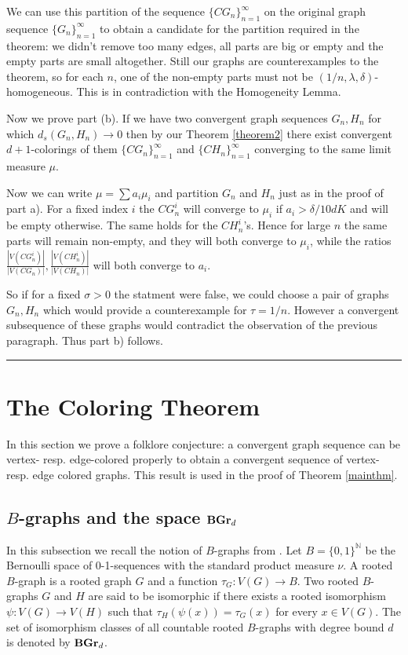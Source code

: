 \documentclass{article}
\newcommand{\N}{\mathbb{N}}
\newcommand{\BGrd}[1][d]{\textrm{\textbf{BGr}}_{#1}}
\newcommand{\qed} {\hspace {0.1in} \rule {1.5mm} {3.5mm}}
\begin{document}
We can use this partition of the sequence $\{CG_n\}^\infty_{n=1}$ on the
original graph sequence $\{G_n\}^\infty_{n=1}$  to obtain a candidate for
 the partition
required in the theorem: we didn't remove too many edges, all parts
are big or empty and the empty parts are small altogether. Still our
graphs are counterexamples to the theorem, so for each $n$, one of the
non-empty parts must not be $(1/n,\lambda, \delta)$-homogeneous. This is
in contradiction with the Homogeneity Lemma.

\noindent
Now we prove part (b).  If we have two convergent graph sequences
$G_n, H_n$ for which $d_s(G_n,H_n) \to 0$ then by our Theorem \ref{theorem2}
there exist convergent $d+1$-colorings of them $\{CG_n\}^\infty_{n=1}$
and $\{CH_n\}^\infty_{n=1}$ converging to the same limit measure $\mu$.

 Now we can write
$\mu = \sum a_i \mu_i$ and partition $G_n$ and $H_n$ just as in the
proof of part a). For a fixed index $i$ the $CG_n^i$ will converge to
$\mu_i$ if $a_i > \delta/10dK$ and will be empty otherwise. The
same holds for the $CH_n^i$'s. Hence for large $n$ the same parts will
remain non-empty, and they will both converge to $\mu_i$, while the
ratios
$\frac{|V(CG_n^i)|}{|V(CG_n)|},\frac{|V(CH_n^i)|}{|V(CH_n)|}$
will both converge to $a_i$. 

So if for a fixed $\sigma > 0$ the statment were false, we could
choose a pair of graphs $G_n, H_n$ which would provide a
counterexample for $\tau = 1/n$. However a convergent subsequence of
these graphs would contradict the observation of the previous
paragraph. Thus part b) follows.

\qed
\section{The Coloring Theorem} \label{color}
In this section we prove a folklore conjecture: a convergent graph sequence
can be vertex- resp. edge-colored properly to obtain a convergent sequence
of vertex- resp. edge colored graphs. This result is used in the proof of 
Theorem \ref{mainthm}.
\subsection{$B$-graphs and the space $\BGrd$}

  In this subsection we recall the notion of $B$-graphs from \cite{Elek}.
  Let $B = \{0,1\}^{\N}$ be the Bernoulli space of
  0-1-sequences with the standard product measure $\nu$. A rooted
  $B$-graph is a rooted graph $G$ and a function $\tau_G : V(G) \to
  B$. Two rooted $B$-graphs $G$ and $H$ are said to be isomorphic if there
  exists a rooted isomorphism $\psi : V(G) \to V(H)$ such that
  $\tau_H(\psi(x)) = \tau_G(x)$ for every $x \in V(G)$. The
  set of isomorphism classes of all countable rooted $B$-graphs with degree
  bound $d$ is denoted by $\BGrd$.
\end{document}
